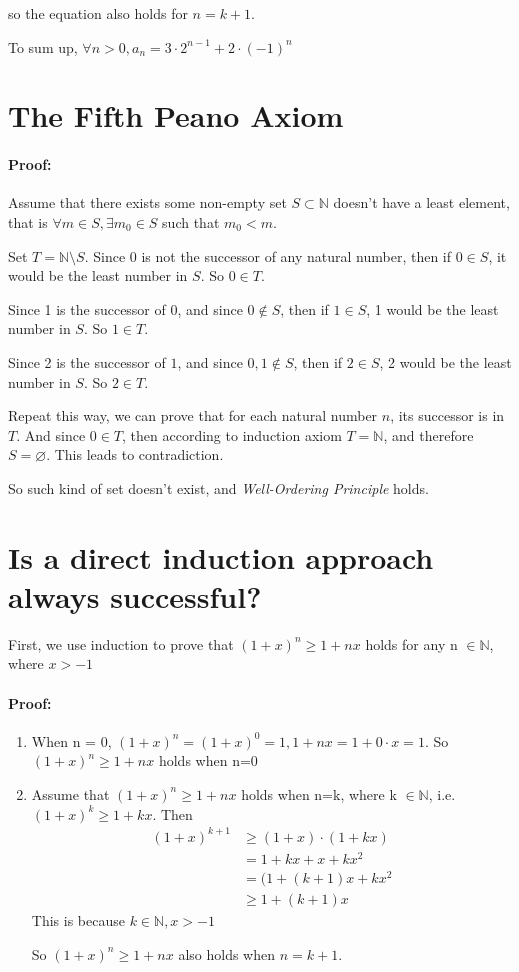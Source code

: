 \documentclass[a4paper,12pt,titlepage]{article}
\begin{document}
so the equation also holds for $n=k+1$.

To sum up, $\forall n>0,a_n=3\cdot2^{n-1}+2\cdot(-1)^n$


\section{The Fifth Peano Axiom}
\paragraph{Proof:}Assume that there exists some non-empty set $S \subset \mathbb{N}$ doesn't have a least element, that is $\forall m\in S, \exists m_0\in S$ such that $m_0<m$.

Set $T=\mathbb{N}\setminus S$. Since 0 is not the successor of any natural number, then if $0\in S$, it would be the least number in $S$. So $0\in T$.

Since 1 is the successor of $0$, and since $0\notin S$, then if $1\in S$, 1 would be the least number in $S$. So $1\in T$. 

Since 2 is the successor of $1$, and since $0,1\notin S$, then if $2\in S$, 2 would be the least number in $S$. So $2\in T$.

Repeat this way, we can prove that for each natural number $n$, its successor is in $T$. And since $0\in T$, then according to induction axiom $T=\mathbb{N}$, and therefore $S=\varnothing$. This leads to contradiction.

So such kind of set doesn't exist, and \textit{Well-Ordering Principle} holds.


\section{Is a direct induction approach always successful?}
First, we use induction to prove that  $(1+x)^n\geqslant1+nx$ holds for any n $\in \mathbb{N}$, where $x > -1$
\paragraph{Proof:}
\begin{enumerate}
	\item When n = 0, $(1+x)^n = (1+x)^0 = 1,1+nx = 1+0 \cdot x=1$. So $(1+x)^n \geqslant 1+nx$ holds when n=0
	\item Assume that $(1+x)^n \geqslant 1+nx$ holds when n=k, where k $\in \mathbb{N}$, i.e. $(1+x)^k \geqslant 1+kx$. Then 
\begin{align*}
(1+x)^{k+1} &\geqslant (1+x) \cdot (1+kx)  \\
	&=1+kx+x+kx^2\\
	&=(1+(k+1)x+kx^2\\
	&\geqslant 1+(k+1)x 
\end{align*}	
This is because $k \in \mathbb{N}, x>-1$	

So $(1+x)^n\geqslant1+nx$ also holds when $n=k+1$. 
\end{enumerate}
\end{document}
